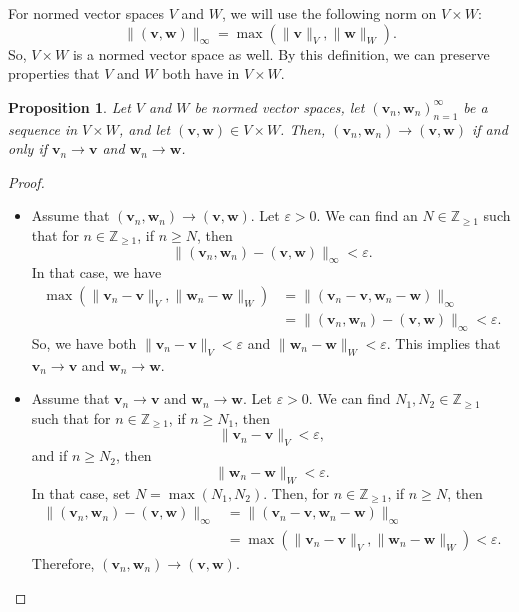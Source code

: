 \documentclass[a4paper, openany]{memoir}
\theoremstyle{definition}
\theoremstyle{plain}
\newtheorem{proposition}[definition]{Proposition}
\begin{document}
    For normed vector spaces $V$ and $W$, we will use the following norm on $V \times W$:
    \[\lVert (\bm{v}, \bm{w}) \rVert_\infty = \max(\lVert \bm{v} \rVert_V, \lVert \bm{w} \rVert_W).\]
    So, $V \times W$ is a normed vector space as well. By this definition, we can preserve properties that $V$ and $W$ both have in $V \times W$.
    \begin{proposition}
        Let $V$ and $W$ be normed vector spaces, let $(\bm{v}_n, \bm{w}_n)_{n=1}^\infty$ be a sequence in $V \times W$, and let $(\bm{v}, \bm{w}) \in V \times W$. Then, $(\bm{v}_n, \bm{w}_n) \to (\bm{v}, \bm{w})$ if and only if $\bm{v}_n \to \bm{v}$ and $\bm{w}_n \to \bm{w}$.
    \end{proposition}
    \begin{proof}
        \hspace*{0pt}
        \begin{itemize}
            \item Assume that $(\bm{v}_n, \bm{w}_n) \to (\bm{v}, \bm{w})$. Let $\varepsilon > 0$. We can find an $N \in \mathbb{Z}_{\geq 1}$ such that for $n \in \mathbb{Z}_{\geq 1}$, if $n \geq N$, then
            \[\lVert (\bm{v}_n, \bm{w}_n) - (\bm{v}, \bm{w}) \rVert_\infty < \varepsilon.\]
            In that case, we have
            \begin{align*}
                \max(\lVert \bm{v}_n - \bm{v} \rVert_V, \lVert \bm{w}_n - \bm{w} \rVert_W) &= \lVert (\bm{v}_n - \bm{v}, \bm{w}_n - \bm{w}) \rVert_\infty \\
                &= \lVert (\bm{v}_n, \bm{w}_n) - (\bm{v}, \bm{w}) \rVert_\infty < \varepsilon.
            \end{align*}
            So, we have both $\lVert \bm{v}_n - \bm{v} \rVert_V < \varepsilon$ and $\lVert \bm{w}_n - \bm{w} \rVert_W < \varepsilon$. This implies that $\bm{v}_n \to \bm{v}$ and $\bm{w}_n \to \bm{w}$.

            \item Assume that $\bm{v}_n \to \bm{v}$ and $\bm{w}_n \to \bm{w}$. Let $\varepsilon > 0$. We can find $N_1, N_2 \in \mathbb{Z}_{\geq 1}$ such that for $n \in \mathbb{Z}_{\geq 1}$, if $n \geq N_1$, then 
            \[\lVert \bm{v}_n - \bm{v} \rVert_V < \varepsilon,\]
            and if $n \geq N_2$, then 
            \[\lVert \bm{w}_n - \bm{w} \rVert_W < \varepsilon.\]
            In that case, set $N = \max(N_1, N_2)$. Then, for $n \in \mathbb{Z}_{\geq 1}$, if $n \geq N$, then
            \begin{align*}
                \lVert (\bm{v}_n, \bm{w}_n) - (\bm{v}, \bm{w}) \rVert_\infty &= \lVert (\bm{v}_n - \bm{v}, \bm{w}_n - \bm{w}) \rVert_\infty \\
                &= \max(\lVert \bm{v}_n - \bm{v} \rVert_V, \lVert \bm{w}_n - \bm{w} \rVert_W) < \varepsilon.
            \end{align*}
            Therefore, $(\bm{v}_n, \bm{w}_n) \to (\bm{v}, \bm{w})$.
        \end{itemize}
    \end{proof}
    
\end{document}
